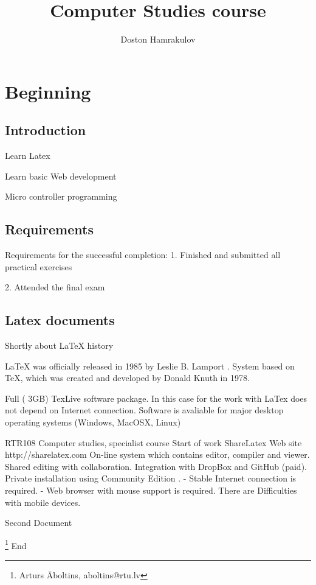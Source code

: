 \documentclass{book}
\begin{document}
\title{Computer Studies course}
\author{Doston Hamrakulov}
\chapter{Beginning}
\section{Introduction}

Learn Latex

Learn basic Web development

Micro controller programming

\section{Requirements}
Requirements for the successful completion:
1. Finished and submitted all practical exercises

2. Attended the final exam

\section{Latex documents}
Shortly about LaTeX history

LaTeX was officially released in 1985 by
Leslie B. Lamport
.
System based on TeX, which was created and developed by
Donald Knuth
in 1978.

Full ( 3GB) TexLive software package. In this case for the
work with LaTex does not depend on Internet connection.
Software is avaliable for major desktop operating systems
(Windows, MacOSX, Linux)

RTR108 Computer studies, specialist course
Start of work
ShareLatex
Web site
http://sharelatex.com
On-line system which contains editor, compiler and
viewer.
Shared editing with collaboration.
Integration with
DropBox
and
GitHub
(paid).
Private installation using
Community Edition
.
- Stable Internet connection is required.
- Web browser with mouse support is required. There are
Difficulties with mobile devices.



Second Document

\thanks{Arturs Āboltins, aboltins@rtu.lv}
End
\end{document}
